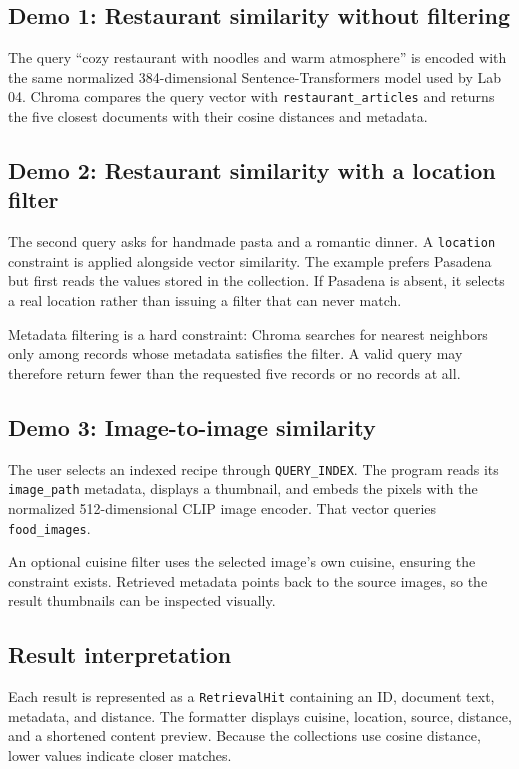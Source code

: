 \documentclass[11pt]{article}
\begin{document}
\subsection{Demo 1: Restaurant similarity without filtering}

The query ``cozy restaurant with noodles and warm atmosphere'' is encoded with
the same normalized 384-dimensional Sentence-Transformers model used by Lab 04.
Chroma compares the query vector with \texttt{restaurant\_articles} and returns
the five closest documents with their cosine distances and metadata.

\subsection{Demo 2: Restaurant similarity with a location filter}

The second query asks for handmade pasta and a romantic dinner. A
\texttt{location} constraint is applied alongside vector similarity. The
example prefers Pasadena but first reads the values stored in the collection.
If Pasadena is absent, it selects a real location rather than issuing a filter
that can never match.

Metadata filtering is a hard constraint: Chroma searches for nearest neighbors
only among records whose metadata satisfies the filter. A valid query may
therefore return fewer than the requested five records or no records at all.

\subsection{Demo 3: Image-to-image similarity}

The user selects an indexed recipe through \texttt{QUERY\_INDEX}. The program
reads its \texttt{image\_path} metadata, displays a thumbnail, and embeds the
pixels with the normalized 512-dimensional CLIP image encoder. That vector
queries \texttt{food\_images}.

An optional cuisine filter uses the selected image's own cuisine, ensuring the
constraint exists. Retrieved metadata points back to the source images, so the
result thumbnails can be inspected visually.

\subsection{Result interpretation}

Each result is represented as a \texttt{RetrievalHit} containing an ID, document
text, metadata, and distance. The formatter displays cuisine, location, source,
distance, and a shortened content preview. Because the collections use cosine
distance, lower values indicate closer matches.
\end{document}
